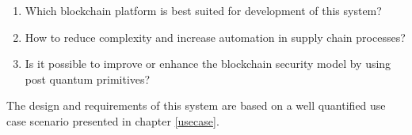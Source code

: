 \begin{enumerate}[label=(\alph*)]
\item Which blockchain platform is best suited for development of this system?
\item How to reduce complexity and increase automation in supply chain processes?
\item Is it possible to improve or enhance the blockchain security model by using post quantum  primitives?
\end{enumerate}

The design and requirements of this system are based on a well quantified use case scenario presented in chapter \ref{usecase}. 

